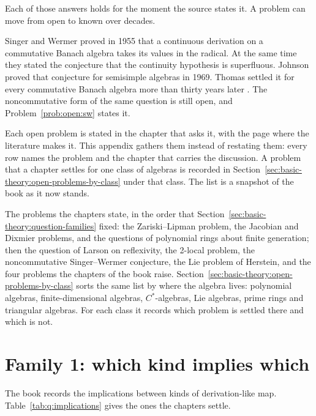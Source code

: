 Each of those answers holds for the moment the source states it.
A problem can move from open to known over decades.

\begin{example}\label{ex:appendix:three-answers}
Singer and Wermer proved in 1955 that a continuous derivation on a commutative
Banach algebra takes its values in the radical.
At the same time they stated the conjecture that the continuity hypothesis is
superfluous.
Johnson proved that conjecture for semisimple algebras in 1969.
Thomas settled it for every commutative Banach algebra more than thirty years
later \cite[p.~710]{BresarVillena2002}.
The noncommutative form of the same question is still open, and
Problem~\ref{prob:open:sw} states it.
\end{example}

Each open problem is stated in the chapter that asks it, with the page where
the literature makes it. %
This appendix gathers them instead of restating them: every row names the
problem and the chapter that carries the discussion.
A problem that a chapter settles for one class of algebras is recorded in
Section~\ref{sec:basic-theory:open-problems-by-class} under that class.
The list is a snapshot of the book as it now stands.

The problems the chapters state, in the order that
Section~\ref{sec:basic-theory:question-families} fixed: the
Zariski--Lipman problem, the Jacobian and Dixmier problems, and the questions of
polynomial rings about finite generation; then the question of Larson on reflexivity,
the 2-local problem, the noncommutative Singer--Wermer conjecture, the Lie
problem of Herstein, and the four problems the chapters of the book raise.
Section~\ref{sec:basic-theory:open-problems-by-class} sorts the same list by
where the algebra lives: polynomial algebras, finite-dimensional algebras,
$C^{*}$-algebras, Lie algebras, prime rings and triangular algebras.
For each class it records which problem is settled there and which is not.

\section{Family 1: which kind implies which}

The book records the implications between kinds of derivation-like map.
Table~\ref{tab:q:implications} gives the ones the chapters settle.

